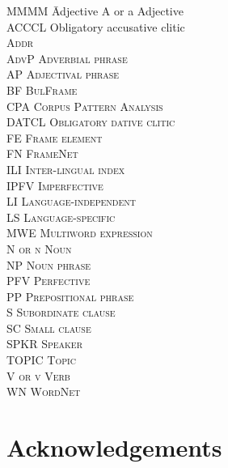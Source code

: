 \documentclass[output=paper,colorlinks,citecolor=brown]{langscibook}
\begin{document}
\begin{multicols}{2}
\begin{tabbing}
MMMM \= Adjective\kill
A or a \> Adjective \\
ACCCL \> Obligatory accusative clitic \\
\scshape Addr \>  \\
AdvP \> Adverbial phrase \\
AP \> Adjectival phrase \\
BF \> BulFrame \\
CPA \> Corpus Pattern Analysis \\
DATCL \> Obligatory dative clitic \\
FE \> Frame element \\
FN \> FrameNet \\
ILI \> Inter-lingual index \\
IPFV \> Imperfective \\
LI \> Language-independent \\
LS \> Language-specific \\
MWE \> Multiword expression \\
N or n \> Noun \\
NP \> Noun phrase \\
PFV \> Perfective \\
PP \> Prepositional phrase \\
S \> Subordinate clause \\
SC \> Small clause \\
SPKR \> {Speaker} \\
TOPIC \> {Topic} \\
V or v \> Verb \\
WN \> WordNet \\
\end{tabbing}
\end{multicols}

\section*{Acknowledgements}
\end{document}
